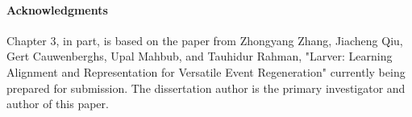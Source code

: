 \paragraph{Acknowledgments}

Chapter 3, in part, is based on the paper from Zhongyang Zhang, Jiacheng Qiu, 
Gert Cauwenberghs, Upal Mahbub, and Tauhidur Rahman, "Larver: Learning Alignment and Representation for Versatile Event Regeneration" currently being prepared for submission. The dissertation author is the primary investigator and author of this paper.